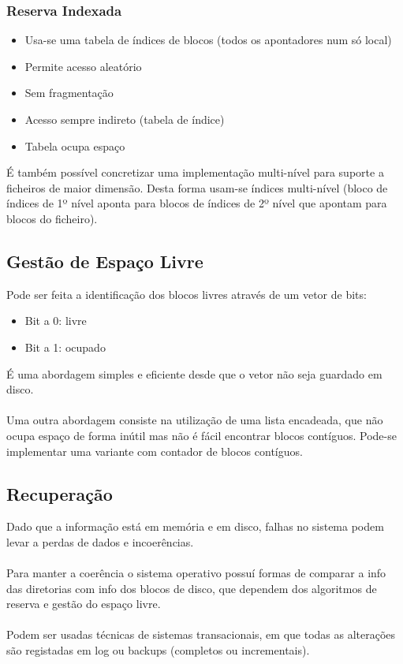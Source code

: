 \documentclass[10pt,a4paper]{report}
\begin{document}
\subsubsection{Reserva Indexada}
\begin{itemize}
\item Usa-se uma tabela de índices de blocos (todos os apontadores num só local)
\item Permite acesso aleatório
\item Sem fragmentação
\item Acesso sempre indireto (tabela de índice)
\item Tabela ocupa espaço
\end{itemize}
É também possível concretizar uma implementação multi-nível para suporte a ficheiros de maior dimensão. Desta forma usam-se índices multi-nível (bloco de índices de 1º nível aponta para blocos de índices de 2º nível que apontam para blocos do ficheiro).
\subsection{Gestão de Espaço Livre}
Pode ser feita a identificação dos blocos livres através de um vetor de bits:
\begin{itemize}
\item Bit a 0: livre
\item Bit a 1: ocupado
\end{itemize}
É uma abordagem simples e eficiente desde que o vetor não seja guardado em disco.\\
\\
Uma outra abordagem consiste na utilização de uma lista encadeada, que não ocupa espaço de forma inútil mas não é fácil encontrar blocos contíguos. Pode-se implementar uma variante com contador de blocos contíguos.
\subsection{Recuperação}
Dado que a informação está em memória e em disco, falhas no sistema podem levar a perdas de dados e incoerências.\\
\\
Para manter a coerência o sistema operativo possuí formas de comparar a info das diretorias com info dos blocos de disco, que dependem dos algoritmos de reserva e gestão do espaço livre.\\
\\
Podem ser usadas técnicas de sistemas transacionais, em que todas as alterações são registadas em log ou backups (completos ou incrementais).
\end{document}
